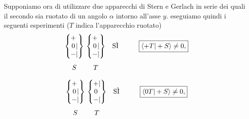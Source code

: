 \documentclass[a4paper,12pt,oneside]{book}
\begin{document}
Supponiamo ora di utilizzare due apparecchi di Stern e Gerlach in serie dei quali il secondo sia ruotato di un angolo $\alpha$ intorno all'asse $y$. eseguiamo quindi i seguenti esperimenti ($T$ indica l'apparecchio ruotato)
	\begin{equation}
		\begin{matrix}
		\begin{Bmatrix}
 			\makebox[\widthof{$-$}]{$+$}\makebox[\widthof{$|$}]{$\ $} \\ \makebox[\widthof{$-$}]{$0$}|\\ - | 
		\end{Bmatrix} \\[0.7cm]
			S
		\end{matrix} \
		\begin{matrix}
		\begin{Bmatrix}
			\makebox[\widthof{$-$}]{$+$}\makebox[\widthof{$|$}]{$\ $} \\ \makebox[\widthof{$-$}]{$0$}|\\ - | 
		\end{Bmatrix} & \textrm{SÌ} & \qquad\boxed{\langle +T | +S \rangle \neq 0,} \\[0.7cm]
			T & &
		\end{matrix}
	\label{SG5}
	\end{equation}

	\begin{equation}
		\begin{matrix}
		\begin{Bmatrix}
			\makebox[\widthof{$-$}]{$+$}\makebox[\widthof{$|$}]{$\ $} \\ \makebox[\widthof{$-$}]{$0$}|\\ - | 
		\end{Bmatrix} \\[0.7cm]
			S
		\end{matrix} \
		\begin{matrix}
		\begin{Bmatrix}
			\makebox[\widthof{$-$}]{$+$} | \\ \makebox[\widthof{$-$}]{$0$}\makebox[\widthof{$|$}]{$\ $} \\ - | 
		\end{Bmatrix} & \textrm{SÌ} & \qquad\boxed{\langle 0T | +S \rangle \neq 0,} \\[0.7cm]
			T & &
		\end{matrix}
	\label{SG6}
	\end{equation}
\end{document}
